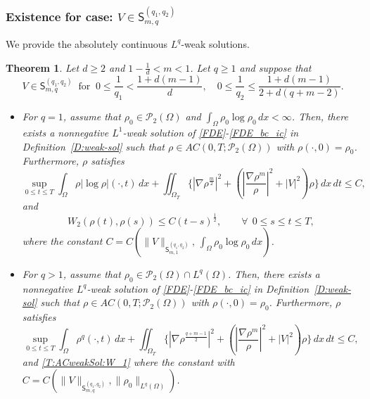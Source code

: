 \documentclass{amsart}
\newtheorem{theorem}[defn]{Theorem}
\numberwithin{equation}{section}
\newcommand{\abs}[1]{\left| #1 \right|}
\begin{document}
\subsubsection{Existence for case: $V \in \mathsf{S}_{m,q}^{(q_1,q_2)}$}\label{SS:energy-sol}

We provide the absolutely continuous $L^q$-weak solutions. 

\begin{theorem}\label{T:ACweakSol}
Let $d\geq 2$ and $ 1-\frac{1}{d} < m <1$. Let $q\geq 1$ and suppose that 
\begin{equation}\label{T:ACweakSol:V_q}
V \in \mathsf{S}_{m,q}^{(q_1,q_2)}  \ \text{ for }  \ 
    0 \leq \frac{1}{q_1} < \frac{1+d(m-1)}{d}, \quad  0\leq \frac{1}{q_2} \leq \frac{1+d(m-1)}{2+d(q+m-2)}.
\end{equation}

\begin{itemize}
	\item[(i)] For $q=1$, assume that $\rho_0 \in  \mathcal{P}_2(\Omega)$ and $\int_{\Omega} \rho_0 \log \rho_0 \,dx < \infty$.  
Then, there exists a nonnegative $L^1$-weak solution of \eqref{FDE}-\eqref{FDE_bc_ic} in Definition~\ref{D:weak-sol} such that  $\rho \in AC(0,T; \mathcal{P}_2 (\Omega))$ with $\rho(\cdot, 0)=\rho_0$.
Furthermore, $\rho$ satisfies
\begin{equation}\label{T:ACweakSol:E_1}
\sup_{0\leq t \leq T} \int_{\Omega} \rho \abs{\log \rho} (\cdot, t)  \,dx
+ \iint_{\Omega_T} \{ \abs{\nabla \rho^{\frac m2}}^2 + \left(\abs{\frac{\nabla
\rho^m}{\rho}}^{2}+|V|^{2}\right ) \rho  \}\,dx\,dt
 \leq  C,
\end{equation}
and
\begin{equation}\label{T:ACweakSol:W_1} %
 W_{2}(\rho(t),\rho(s))\leq C (t-s)^{\frac{1}{2}},\qquad
\forall ~~0\leq s\leq t\leq T,
\end{equation}
where the constant $C= C ( \|V\|_{\mathsf{S}_{m,1}^{(q_1,q_2)}},\,
\int_{\Omega} \rho_0 \log \rho_0 \,dx )$.

\smallskip

\item[(ii)] For $q>1$, assume that $\rho_0 \in  \mathcal{P}_2(\Omega) \cap L^q (\Omega)$.
Then, there exists a nonnegative $L^q$-weak solution of \eqref{FDE}-\eqref{FDE_bc_ic} in Definition~\ref{D:weak-sol} such that  $\rho \in AC(0,T; \mathcal{P}_2 (\Omega))$ with $\rho(\cdot, 0)=\rho_0$.
Furthermore, $\rho$ satisfies
 \begin{equation}\label{T:ACweakSol:E_q}
 \sup_{0\leq t \leq T} \int_{\Omega} \rho^q(\cdot, t) \,dx
 + \iint_{\Omega_T} \{ \abs{\nabla \rho^{\frac{q+m-1}{2}}}^2  + \left(\abs{\frac{\nabla
\rho^m}{\rho}}^{2}+|V|^{2}\right ) \rho  \}\,dx\,dt
\leq C,
\end{equation}
and \eqref{T:ACweakSol:W_1} where the constant
with $C = C ( \|V\|_{\mathsf{S}_{m,q}^{(q_1, q_2)}}, \| \rho_0 \|_{L^{q}(\Omega)} )$.

\end{itemize}
\end{theorem}
\end{document}
